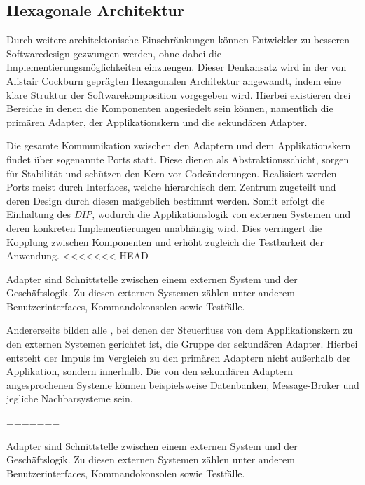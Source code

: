 \subsection{Hexagonale Architektur}

Durch weitere architektonische Einschränkungen können Entwickler zu besseren Softwaredesign gezwungen werden, ohne dabei die Implementierungsmöglichkeiten einzuengen. Dieser Denkansatz wird in der von Alistair Cockburn geprägten Hexagonalen Architektur angewandt, indem eine klare Struktur der Softwarekomposition vorgegeben wird. Hierbei existieren drei Bereiche in denen die Komponenten angesiedelt sein können, namentlich die primären Adapter, der Applikationskern und die sekundären Adapter. 

Die gesamte Kommunikation zwischen den Adaptern und dem Applikationskern findet über sogenannte Ports statt. Diese dienen als Abstraktionsschicht, sorgen für Stabilität und schützen den Kern vor Codeänderungen. Realisiert werden Ports meist durch Interfaces, welche hierarchisch dem Zentrum zugeteilt und deren Design durch diesen maßgeblich bestimmt werden. Somit erfolgt die Einhaltung des \emph{\acrlong{DIP}}, wodurch die Applikationslogik von externen Systemen und deren konkreten Implementierungen unabhängig wird. Dies verringert die Kopplung zwischen Komponenten und erhöht zugleich die Testbarkeit der Anwendung.
<<<<<<< HEAD

Adapter sind Schnittstelle zwischen einem externen System und der Geschäftslogik.  Zu diesen externen Systemen zählen unter anderem Benutzerinterfaces, Kommandokonsolen sowie Testfälle. 

Andererseits bilden alle , bei denen der Steuerfluss von dem Applikationskern zu den externen Systemen gerichtet ist, die Gruppe der sekundären Adapter. Hierbei entsteht der Impuls im Vergleich zu den primären Adaptern nicht außerhalb der Applikation, sondern innerhalb. Die von den sekundären Adaptern angesprochenen Systeme können beispielsweise Datenbanken, Message-Broker und jegliche Nachbarsysteme sein. 

=======

Adapter sind Schnittstelle zwischen einem externen System und der Geschäftslogik.  Zu diesen externen Systemen zählen unter anderem Benutzerinterfaces, Kommandokonsolen sowie Testfälle. 

